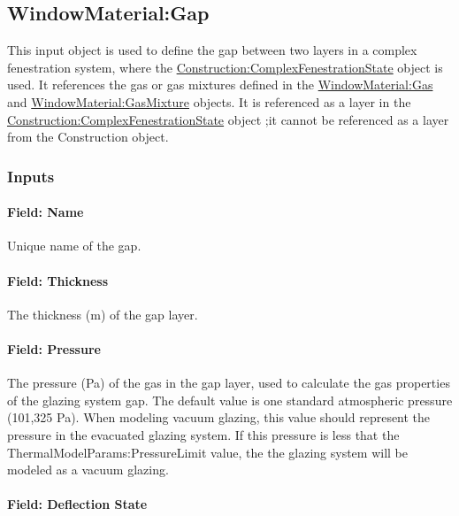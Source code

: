 \subsection{WindowMaterial:Gap}\label{windowmaterialgap}

This input object is used to define the gap between two layers in a complex fenestration system, where the \hyperref[constructioncomplexfenestrationstate]{Construction:ComplexFenestrationState} object is used. It references the gas or gas mixtures defined in the \hyperref[windowmaterialgas]{WindowMaterial:Gas} and \hyperref[windowmaterialgasmixture]{WindowMaterial:GasMixture} objects. It is referenced as a layer in the \hyperref[constructioncomplexfenestrationstate]{Construction:ComplexFenestrationState} object ;it cannot be referenced as a layer from the Construction object.

\subsubsection{Inputs}\label{inputs-18-009}

\paragraph{Field: Name}\label{field-name-12-011}

Unique name of the gap.

\paragraph{Field: Thickness}\label{field-thickness-5}

The thickness (m) of the gap layer.

\paragraph{Field: Pressure}\label{field-pressure-000}

The pressure (Pa) of the gas in the gap layer, used to calculate the gas properties of the glazing system gap. The default value is one standard atmospheric pressure (101,325 Pa). When modeling vacuum glazing, this value should represent the pressure in the evacuated glazing system. If this pressure is less that the ThermalModelParams:PressureLimit value, the the glazing system will be modeled as a vacuum glazing.

\paragraph{Field: Deflection State}\label{field-deflection-state}

